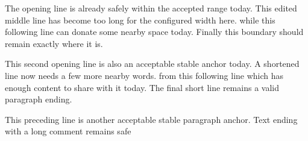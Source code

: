 \documentclass{article}
\begin{document}
The opening line is already safely within the accepted range today.
This edited middle line has become too long for the configured width here.
while this following line can donate some nearby space today.
Finally this boundary should remain exactly where it is.

This second opening line is also an acceptable stable anchor today.
A shortened line now needs a few more nearby words.
from this following line which has enough content to share with it today.
The final short line remains a valid paragraph ending.

This preceding line is another acceptable stable paragraph anchor.
Text ending with a long comment remains safe %
\end{document}
